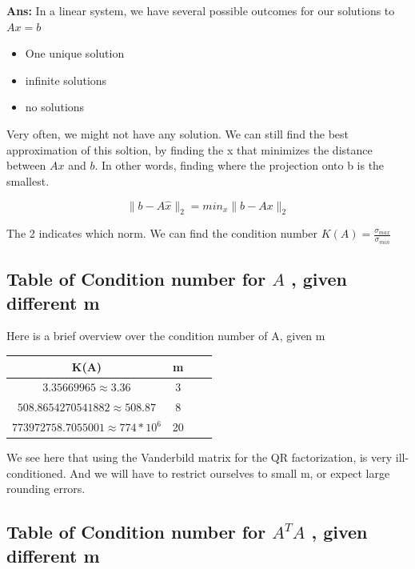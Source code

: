 \documentclass[11pt]{article}
\newenvironment{solbox}
  {\begin{mdframed}[linewidth=1pt,linecolor=black,roundcorner=5pt]
   \noindent\textbf{Ans: }\enspace}
  {\end{mdframed}}
\begin{document}
\begin{solbox}
    In a linear system, we have several possible outcomes for our solutions to $ Ax=b$
    
    \begin{itemize}
        \item One unique solution
        \item infinite solutions
        \item no solutions
    \end{itemize}

    Very often, we might not have any solution. We can still find the best approximation of this soltion, by finding the x that minimizes the distance between $ Ax $ and $ b $. In other words, finding where the projection onto b is the smallest. 

    \[
         \|b-A \hat{x} \|_2 = min_x \|b - Ax \|_2
    \] 

    The 2 indicates which norm. We can find the condition number $ K(A) = \frac{\sigma_{max}} {\sigma_{min}} $ 
    

    \subsection{Table of Condition number for $ A $ , given different m}
    
    Here is a brief overview over the condition number of A, given m



    \begin{center}
    \begin{tabular}{||c c c c||} 
    \hline
    K(A) & m \\ [0.5ex] 
    \hline
    $ 3.35669965 \approx 3.36  $  & 3 \\ 
    \hline
    $ 508.8654270541882 \approx 508.87 $  & 8 \\
    \hline
    $ 773972758.7055001 \approx 774 * 10^{6} $  & 20 \\ 
    \hline
    \end{tabular}
    \end{center}


    We see here that using the Vanderbild matrix for the QR factorization, is very ill-conditioned. And we will have to restrict ourselves to small m, or expect large rounding errors. 

    \subsection{Table of Condition number for $ A^TA $ , given different m}


\end{solbox}
\end{document}
